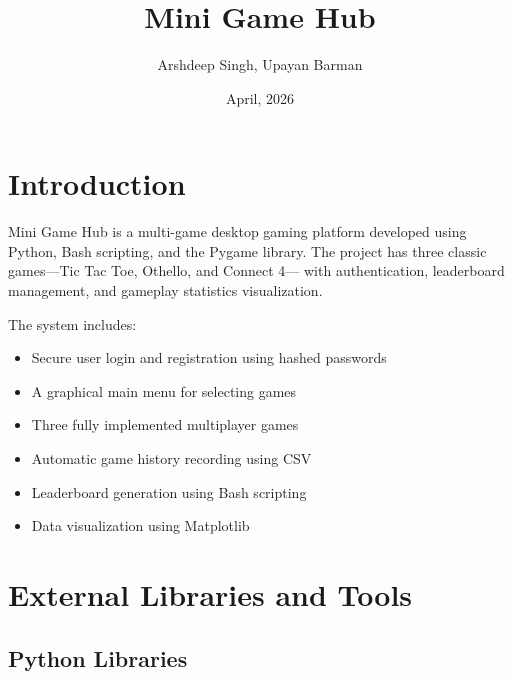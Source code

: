 \documentclass[12pt,a4paper]{article}
\title{
    \Huge \textbf{Mini Game Hub}\\[0.5cm]
}
\author{Arshdeep Singh, Upayan Barman}
\date{April, 2026}
\begin{document}
\maketitle
\tableofcontents
\newpage
\section{Introduction}

Mini Game Hub is a multi-game desktop gaming platform developed using Python, Bash scripting, and the Pygame library. The project has three classic games—Tic Tac Toe, Othello, and Connect 4— with authentication, leaderboard management, and gameplay statistics visualization.

The system includes:

\begin{itemize}
    \item Secure user login and registration using hashed passwords
    \item A graphical main menu for selecting games
    \item Three fully implemented multiplayer games
    \item Automatic game history recording using CSV
    \item Leaderboard generation using Bash scripting
    \item Data visualization using Matplotlib
\end{itemize}

\section{External Libraries and Tools}

\subsection{Python Libraries}
\end{document}
